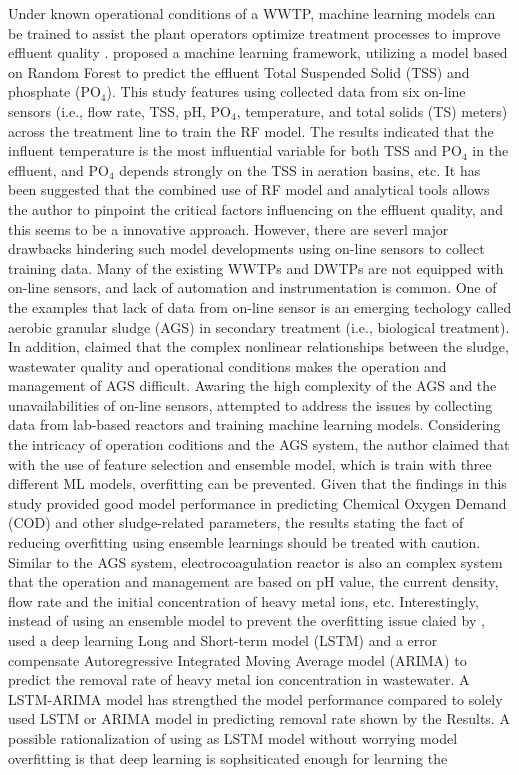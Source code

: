 Under known operational conditions of a WWTP, machine learning models can be trained to assist the plant operators optimize treatment processes to improve effluent quality . \citet{wangMachineLearningFramework2021} proposed a machine learning framework, utilizing a model based on Random Forest to predict the effluent Total Suspended Solid (TSS) and phosphate (PO$_4$). This study features using collected data from six on-line sensors (i.e., flow rate, TSS, pH, PO$_4$, temperature, and total solids (TS) meters) across the treatment line to train the RF model. The results indicated that the influent temperature is the most influential variable for both TSS and PO$_4$ in the effluent, and PO$_4$ depends strongly on the TSS in aeration basins, etc. It has been suggested that the combined use of RF model and analytical tools allows the author to pinpoint the critical factors influencing on the effluent quality, and this seems to be a innovative approach. However, there are severl major drawbacks hindering such model developments using on-line sensors to collect training data. Many of the existing WWTPs and DWTPs are not equipped with on-line sensors, and lack of automation and instrumentation is common. One of the examples that lack of data from on-line sensor is an emerging techology called aerobic granular sludge (AGS) in secondary treatment (i.e., biological treatment). In addition, \citet{wilenMechanismsGranulationActivated2018} claimed that the complex nonlinear relationships between the sludge, wastewater quality and operational conditions makes the operation and management of AGS difficult. Awaring the high complexity of the AGS and the unavailabilities of on-line sensors, \citet{zaghloulDevelopmentEnsembleMachine2021} attempted to address the issues by collecting data from lab-based reactors and training machine learning models. Considering the intricacy of operation coditions and the AGS system, the author claimed that with the use of feature selection and ensemble model, which is train with three different ML models, overfitting can be prevented. Given that the findings in this study provided good model performance in predicting Chemical Oxygen Demand (COD) and other sludge-related parameters, the results stating the fact of reducing overfitting using ensemble learnings should be treated with caution. Similar to the AGS system, electrocoagulation reactor is also an complex system that the operation and management are based on pH value, the current density, flow rate and the initial concentration of heavy metal ions, etc. Interestingly, instead of using an ensemble model to prevent the overfitting issue claied by \citet{zaghloulDevelopmentEnsembleMachine2021}, \citet{zhuPredictionMethodElectrocoagulation2021} used a deep learning Long and Short-term model (LSTM) and a error compensate Autoregressive Integrated Moving Average model (ARIMA) to predict the removal rate of heavy metal ion concentration in wastewater. A LSTM-ARIMA model has strengthed the model performance compared to solely used LSTM or ARIMA model in predicting removal rate shown by the Results. A possible rationalization of using as LSTM model without worrying model overfitting is that deep learning is sophsiticated enough for learning the 